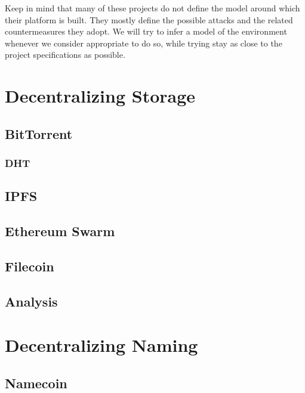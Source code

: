 \documentclass[mscthesis]{usiinfthesis}
\begin{document}
Keep in mind that many of these projects do not define the model around which their platform is built. They mostly define the possible attacks and the related countermeasures they adopt. We will try to infer a model of the environment whenever we consider appropriate to do so, while trying stay as close to the project specifications as possible.


\chapter{Decentralizing Storage}

\section{BitTorrent}\label{proj:bittorrent}

\subsection{DHT}\label{tech:dht}

\section{IPFS}\label{proj:ipfs}

\section{Ethereum Swarm}\label{proj:swarm}

\section{Filecoin}\label{proj:filecoin}

\section{Analysis}


\chapter{Decentralizing Naming}

\section{Namecoin}\label{proj:namecoin}
\end{document}
